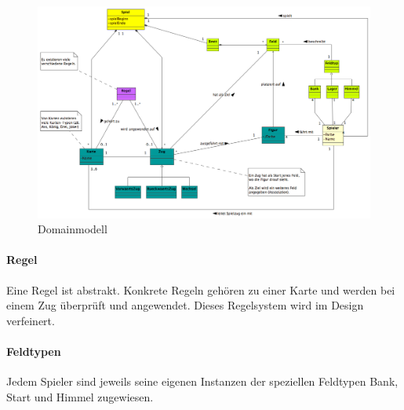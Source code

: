 \documentclass[12pt,halfparskip]{scrartcl}
\begin{document}
\begin{figure}
	[htp] \centering 
	\includegraphics[width=1\textwidth]{DomainModel.png} \caption{Domainmodell}\label{fig:DomainModel.png} 
\end{figure}
\paragraph{Regel}\label{ssub:regel} %
Eine Regel ist abstrakt. Konkrete Regeln gehören zu einer Karte und werden bei einem Zug überprüft und angewendet. Dieses Regelsystem wird im Design verfeinert.
\paragraph{Feldtypen}\label{ssub:feldtypen} %
Jedem Spieler sind jeweils seine eigenen Instanzen der speziellen Feldtypen Bank, Start und Himmel zugewiesen.

\newpage
\end{document}
